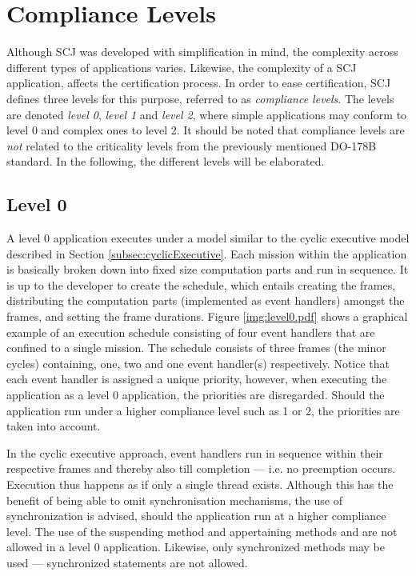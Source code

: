 \section{Compliance Levels}
\label{section:complianceLevels}
Although SCJ was developed with simplification in mind, the complexity across different types of applications varies. Likewise, the complexity of a SCJ application, affects the certification process. In order to ease certification, SCJ defines three levels for this purpose, referred to as \textit{compliance levels}. The levels are denoted \textit{level 0}, \textit{level 1} and \textit{level 2}, where simple applications may conform to level 0 and complex ones to level 2. It should be noted that compliance levels are \textit{not} related to the criticality levels from the previously mentioned DO-178B standard. In the following, the different levels will be elaborated.

\subsection{Level 0}
A level 0 application executes under a model similar to the cyclic executive model described in Section \ref{subsec:cyclicExecutive}. Each mission within the application is basically broken down into fixed size computation parts and run in sequence. It is up to the developer to create the schedule, which entails creating the frames, distributing the computation parts (implemented as event handlers) amongst the frames, and setting the frame durations. Figure \ref{img:level0.pdf} shows a graphical example of an execution schedule consisting of four event handlers that are confined to a single mission. The schedule consists of three frames (the minor cycles) containing, one, two and one event handler(s) respectively. Notice that each event handler is assigned a unique priority, however, when executing the application as a level 0 application, the priorities are disregarded. Should the application run under a higher compliance level such as 1 or 2, the priorities are taken into account.


In the cyclic executive approach, event handlers run in sequence within their respective frames and thereby also till completion --- i.e. no preemption occurs. Execution thus happens as if only a single thread exists. Although this has the benefit of being able to omit synchronisation mechanisms, the use of synchronization is advised, should the application run at a higher compliance level. The use of the suspending method  and appertaining methods  and  are not allowed in a level 0 application. Likewise, only synchronized methods may be used --- synchronized statements are not allowed.

